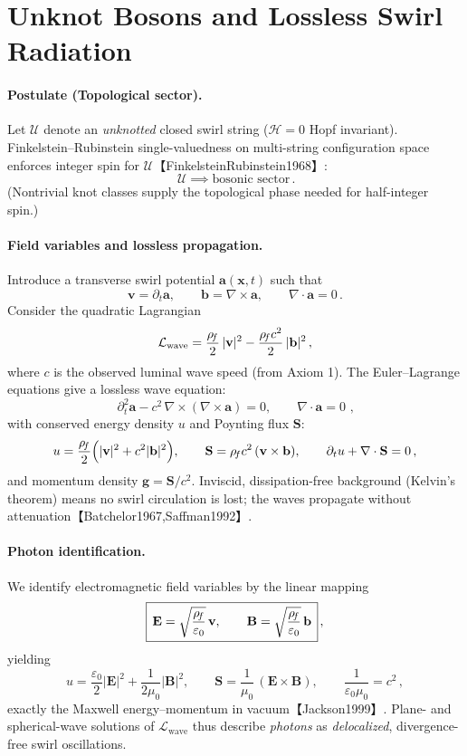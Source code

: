 \documentclass[11pt]{article}
\begin{document}
\section{Unknot Bosons and Lossless Swirl Radiation}
\label{sec:bosons_photons}
\paragraph{Postulate (Topological sector).}
    Let $\mathcal{U}$ denote an \emph{unknotted} closed swirl string ($\mathcal{H}=0$ Hopf invariant). Finkelstein–Rubinstein single-valuedness on multi-string configuration space enforces integer spin for $\mathcal{U}$【FinkelsteinRubinstein1968】:
    \[
        \boxed{\,\mathcal{U} \implies \text{bosonic sector}\,.}
    \]
    (Nontrivial knot classes supply the topological phase needed for half-integer spin.)

\paragraph{Field variables and lossless propagation.}
    Introduce a transverse swirl potential $\mathbf{a}(\mathbf{x},t)$ such that
    \[
        \mathbf{v} = \partial_t \mathbf{a}, \qquad
        \mathbf{b} = \nabla\times \mathbf{a}, \qquad \nabla\cdot \mathbf{a}=0\,.
    \]
    Consider the quadratic Lagrangian
    \[
        \mathcal{L}_{\text{wave}} = \frac{\rho_{\!f}}{2}\,|\mathbf{v}|^2 - \frac{\rho_{\!f} c^2}{2}\,|\mathbf{b}|^2\,,
    \]
    where $c$ is the observed luminal wave speed (from Axiom 1). The Euler–Lagrange equations give a lossless wave equation:
    \[
        \boxed{\,\partial_t^2 \mathbf{a} - c^2\,\nabla\times(\nabla\times \mathbf{a}) = 0, \qquad \nabla\cdot \mathbf{a}=0\,}\,,
    \]
    with conserved energy density $u$ and Poynting flux $\mathbf{S}$:
    \[
        u = \frac{\rho_{\!f}}{2}\Big(|\mathbf{v}|^2 + c^2|\mathbf{b}|^2\Big), \qquad
        \mathbf{S} = \rho_{\!f} c^2\,(\mathbf{v}\times \mathbf{b}), \qquad
        \partial_t u + \nabla\cdot \mathbf{S}=0\,,
    \]
    and momentum density $\mathbf{g}=\mathbf{S}/c^2$. Inviscid, dissipation-free background (Kelvin’s theorem) means no swirl circulation is lost; the waves propagate without attenuation【Batchelor1967,Saffman1992】.

\paragraph{Photon identification.}
    We identify electromagnetic field variables by the linear mapping
    \[
        \boxed{\,\mathbf{E} = \sqrt{\frac{\rho_{\!f}}{\varepsilon_0}}\,\mathbf{v}, \qquad
        \mathbf{B} = \sqrt{\frac{\rho_{\!f}}{\varepsilon_0}}\,\mathbf{b}\,}\,,
    \]
    yielding
    \[
        u = \frac{\varepsilon_0}{2}|\mathbf{E}|^2 + \frac{1}{2\mu_0}|\mathbf{B}|^2, \qquad
        \mathbf{S} = \frac{1}{\mu_0}\,(\mathbf{E}\times \mathbf{B}), \qquad
        \frac{1}{\varepsilon_0 \mu_0} = c^2\,,
    \]
    exactly the Maxwell energy–momentum in vacuum【Jackson1999】. Plane- and spherical-wave solutions of $\mathcal{L}_{\text{wave}}$ thus describe \emph{photons} as \emph{delocalized}, divergence-free swirl oscillations.
\end{document}
